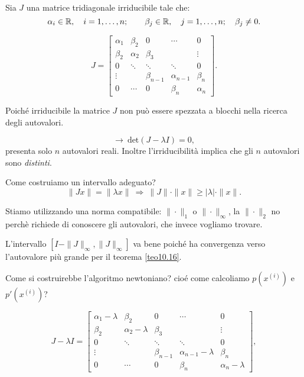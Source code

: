 \begin{exe}
Sia $J$ una matrice tridiagonale irriducibile tale che: 
\[\alpha_i \in \mathbb{R}, \quad i = 1,\ldots, n; \qquad \beta_j \in \mathbb{R}, \quad j =
1, \ldots, n; \quad \beta_j \neq 0.\]

\[J = \left[
\begin{array}{ccccc}
\alpha_1 & \beta_2 & 0  &\cdots & 0 \\
\beta_2 & \alpha_2 & \beta_3 & & \vdots \\
0 &\ddots &\ddots &\ddots &  0\\
\vdots & &\beta_{n-1} & \alpha_{n-1}& \beta_n\\
0 & \cdots & 0 &\beta_{n} & \alpha_{n}
\end{array}
\right].\]

Poiché irriducibile la matrice $J$ non può essere spezzata a blocchi nella
ricerca degli autovalori.

\[\longrightarrow \
\textrm{det}(J - \lambda I) = 0,
\]
presenta solo $n$ autovalori reali. Inoltre l'irriducibilità implica che
gli $n$ autovalori sono \emph{distinti}.

Come costruiamo un intervallo adeguato?
\[
\|Jx\|= \|\lambda x\| \ \Rightarrow \ \|J\|\cdot\|x\| \geq |\lambda|\cdot\|x
\|.\]
\begin{notabene}
Stiamo utilizzando una norma compatibile: $\|\cdot\|_1$ o $\|\cdot\|_\infty$, 
la $\|\cdot\|_2$ no perchè richiede di conoscere gli autovalori, che invece 
vogliamo trovare.
\end{notabene}
L'intervallo $\left[I-\|J\|_\infty, \|J\|_\infty\right]$ va bene poiché ha 
convergenza  verso l'autovalore più grande per il teorema \ref{teo10.16}. 

Come si costruirebbe l'algoritmo newtoniano? cioé come calcoliamo $p(x^{(i)})$
e $p'(x^{(i)})$?

\[J-\lambda I = \left[
\begin{array}{ccccc}
\alpha_1-\lambda & \beta_2 & 0  &\cdots & 0 \\
\beta_2 & \alpha_2-\lambda & \beta_3 & & \vdots \\
0 &\ddots &\ddots &\ddots &  0\\
\vdots & &\beta_{n-1} & \alpha_{n-1}-\lambda& \beta_n\\
0 & \cdots & 0 &\beta_{n} & \alpha_{n}-\lambda
\end{array}
\right],\]


\end{exe}
